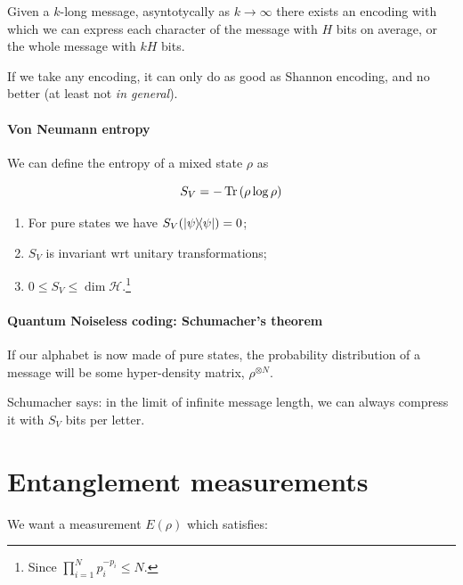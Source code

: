 \documentclass[main.tex]{subfiles}
\begin{document}
Given a \(k\)-long message, asyntotycally as \(k \rightarrow \infty\) there exists an encoding with which we can express each character of the message with \(H\) bits on average, or the whole message with \(kH\) bits.

If we take any encoding, it can only do as good as Shannon encoding, and no better (at least not \emph{in general}).

\paragraph{Von Neumann entropy}

We can define the entropy of a mixed state \(\rho\) as

\begin{equation}
    S_V = -\operatorname*{Tr} \qty(\rho \log\rho )
\end{equation}

\begin{enumerate}
    \item For pure states we have \(S_V (\dyad{\psi} ) = 0\);
    \item \(S_V\) is invariant wrt unitary transformations;
    \item \(0 \leq S_V \leq \dim \mathcal H\).\footnote{Since \(\prod_{i=1}^{N} p_i^{-p_i} \leq N\).}
\end{enumerate}

\paragraph{Quantum Noiseless coding: Schumacher's theorem}

If our alphabet is now made of pure states, the probability distribution of a message will be some hyper-density matrix, \(\rho^{\otimes N}\).

Schumacher says: in the limit of infinite message length, we can always compress it with \(S_V\) bits per letter.

\section{Entanglement measurements}

We want a measurement \(E(\rho)\) which satisfies:
\end{document}
